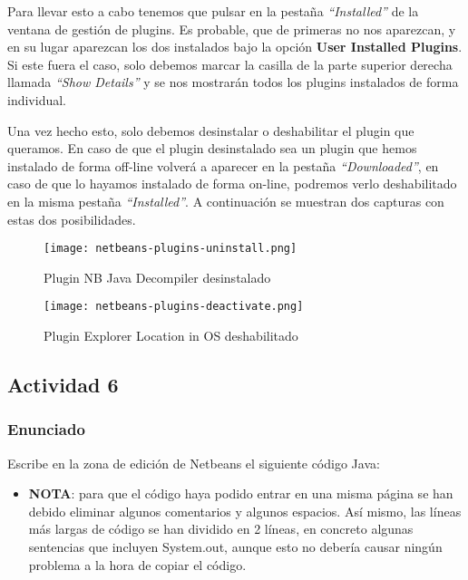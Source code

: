 Para llevar esto a cabo tenemos que pulsar en la pestaña \textit{``Installed''} de la ventana de gestión de plugins. Es probable, que de primeras no nos aparezcan, y en su lugar aparezcan los dos instalados bajo la opción \textbf{User Installed Plugins}. Si este fuera el caso, solo debemos marcar la casilla de la parte superior derecha llamada \textit{``Show Details''} y se nos mostrarán todos los plugins instalados de forma individual.

Una vez hecho esto, solo debemos desinstalar o deshabilitar el plugin que queramos. En caso de que el plugin desinstalado sea un plugin que hemos instalado de forma off-line volverá a aparecer en la pestaña \textit{``Downloaded''}, en caso de que lo hayamos instalado de forma on-line, podremos verlo deshabilitado en la misma pestaña \textit{``Installed''}. A continuación se muestran dos capturas con estas dos posibilidades.

\begin{figure}[H]
    \centering
    \texttt{[image: netbeans-plugins-uninstall.png]}
    \caption{Plugin NB Java Decompiler desinstalado}
\end{figure}

\begin{figure}[H]
    \centering
    \texttt{[image: netbeans-plugins-deactivate.png]}
    \caption{Plugin Explorer Location in OS deshabilitado}
\end{figure}

\subsection{Actividad 6}
\subsubsection{Enunciado}
Escribe en la zona de edición de Netbeans el siguiente código Java:

\begin{itemize}
    \item \textbf{NOTA}: para que el código haya podido entrar en una misma página se han debido eliminar algunos comentarios y algunos espacios. Así mismo, las líneas más largas de código se han dividido en 2 líneas, en concreto algunas sentencias que incluyen System.out, aunque esto no debería causar ningún problema a la hora de copiar el código.
\end{itemize}

